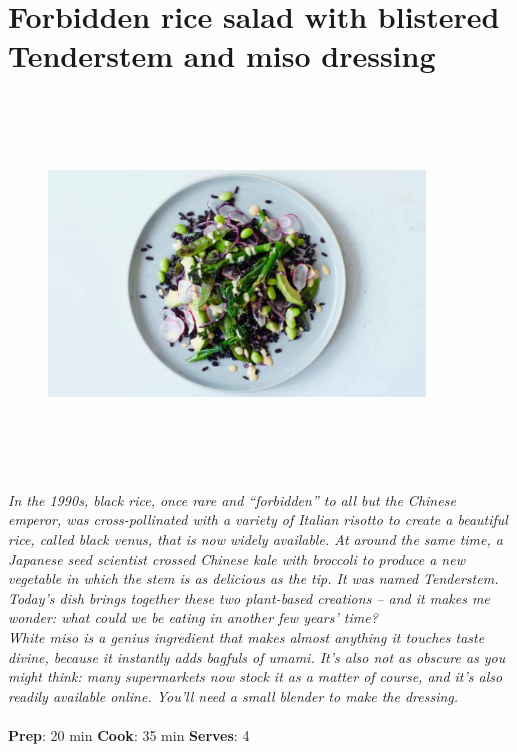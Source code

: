 \documentclass{book}
\begin{document}
\section{Forbidden rice salad with blistered Tenderstem and miso dressing}
\begin{figure}
\centering\includegraphics[width=10cm,height=10cm,keepaspectratio]{Recipe_Pictures/Forbidden_rice_salad_with_blistered_Tenderstem_and_miso_dressing.png}
\end{figure}
\emph{In the 1990s, black rice, once rare and “forbidden” to all but the Chinese emperor, was cross-pollinated with a variety of Italian risotto to create a beautiful rice, called black venus, that is now widely available. At around the same time, a Japanese seed scientist crossed Chinese kale with broccoli to produce a new vegetable in which the stem is as delicious as the tip. It was named Tenderstem. Today’s dish brings together these two plant-based creations – and it makes me wonder: what could we be eating in another few years’ time?\\ 
White miso is a genius ingredient that makes almost anything it touches taste divine, because it instantly adds bagfuls of umami. It’s also not as obscure as you might think: many supermarkets now stock it as a matter of course, and it’s also readily available online. You’ll need a small blender to make the dressing.}\\\\ 
\textbf{Prep}: 20 min
\textbf{Cook}: 35 min
\textbf{Serves}: 4
\end{document}
